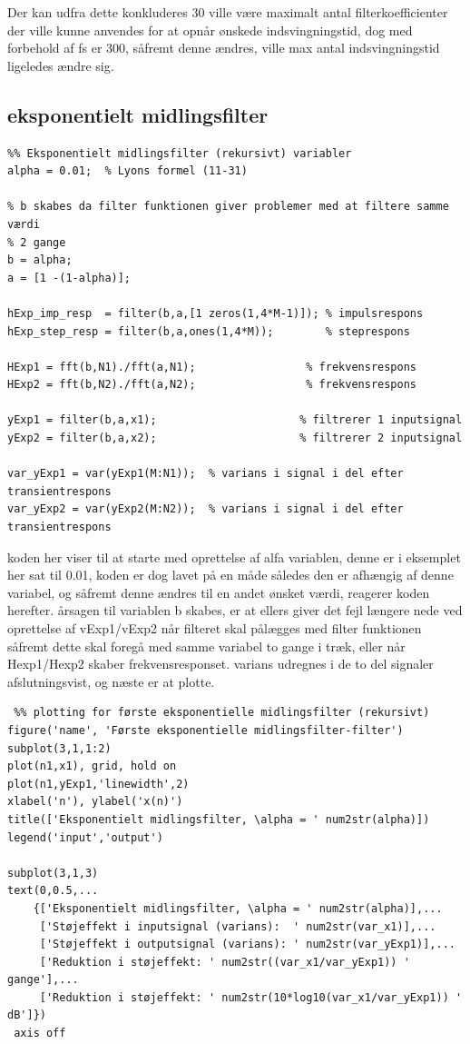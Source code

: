 \documentclass{article}
\begin{document}
Der kan udfra dette konkluderes 30 ville være maximalt antal filterkoefficienter der ville kunne anvendes for at opnår ønskede indsvingningstid, dog med forbehold af fs er 300, såfremt denne ændres, ville max antal indsvingningstid ligeledes ændre sig.

\subsection{eksponentielt midlingsfilter}
\label{sec:eks}
\begin{lstlisting}
%% Eksponentielt midlingsfilter (rekursivt) variabler
alpha = 0.01;  % Lyons formel (11-31)

% b skabes da filter funktionen giver problemer med at filtere samme værdi
% 2 gange
b = alpha;
a = [1 -(1-alpha)];

hExp_imp_resp  = filter(b,a,[1 zeros(1,4*M-1)]); % impulsrespons
hExp_step_resp = filter(b,a,ones(1,4*M));        % steprespons

HExp1 = fft(b,N1)./fft(a,N1);                 % frekvensrespons
HExp2 = fft(b,N2)./fft(a,N2);                 % frekvensrespons

yExp1 = filter(b,a,x1);                      % filtrerer 1 inputsignal
yExp2 = filter(b,a,x2);                      % filtrerer 2 inputsignal

var_yExp1 = var(yExp1(M:N1));  % varians i signal i del efter transientrespons
var_yExp2 = var(yExp2(M:N2));  % varians i signal i del efter transientrespons

\end{lstlisting}

koden her viser til at starte med oprettelse af alfa variablen, denne er i eksemplet her sat til 0.01, koden er dog lavet på en måde således den er afhængig af denne variabel, og såfremt denne ændres til en andet ønsket værdi, reagerer koden herefter.
årsagen til variablen b skabes, er at ellers giver det fejl længere nede ved oprettelse af vExp1/vExp2 når filteret skal pålægges med filter funktionen såfremt dette skal foregå med samme variabel to gange i træk, eller når Hexp1/Hexp2 skaber frekvensresponset.
varians udregnes i de to del signaler afslutningsvist, og næste er at plotte.

\begin{lstlisting}
 %% plotting for første eksponentielle midlingsfilter (rekursivt) 
figure('name', 'Første eksponentielle midlingsfilter-filter')
subplot(3,1,1:2)
plot(n1,x1), grid, hold on
plot(n1,yExp1,'linewidth',2)
xlabel('n'), ylabel('x(n)')
title(['Eksponentielt midlingsfilter, \alpha = ' num2str(alpha)])
legend('input','output')

subplot(3,1,3)
text(0,0.5,...
    {['Eksponentielt midlingsfilter, \alpha = ' num2str(alpha)],...
     ['Støjeffekt i inputsignal (varians):  ' num2str(var_x1)],...
     ['Støjeffekt i outputsignal (varians): ' num2str(var_yExp1)],...
     ['Reduktion i støjeffekt: ' num2str((var_x1/var_yExp1)) ' gange'],...
     ['Reduktion i støjeffekt: ' num2str(10*log10(var_x1/var_yExp1)) ' dB']})
 axis off
\end{lstlisting}
\end{document}
